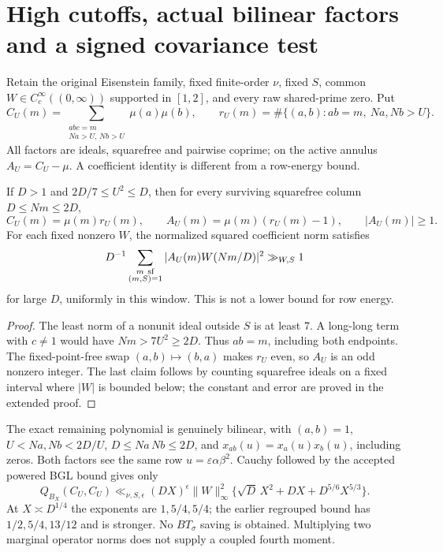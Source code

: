 \section{High cutoffs, actual bilinear factors and a signed covariance test}\label{sb:core}
Retain the original Eisenstein family, fixed finite-order $\nu$, fixed $S$,
common $W\in C_c^\infty((0,\infty))$ supported in $[1,2]$, and every raw
shared-prime zero. Put
\[
 C_U(m)=\sum_{\substack{abc=m\\Na>U,\,Nb>U}}\mu(a)\mu(b),\qquad
 r_U(m)=\#\{(a,b):ab=m,\ Na,Nb>U\}.
\]
All factors are ideals, squarefree and pairwise coprime; on the active
annulus $A_U=C_U-\mu$. A coefficient identity is different from a row-energy bound.

\begin{proposition}\label{sb:window}
If $D>1$ and $2D/7\le U^2\le D$, then for every surviving squarefree
column $D\le Nm\le2D$,
\[
 C_U(m)=\mu(m)r_U(m),\qquad
 A_U(m)=\mu(m)(r_U(m)-1),\qquad |A_U(m)|\ge1.       
\]
For each fixed nonzero $W$, the normalized squared coefficient norm satisfies
\begin{equation}
 D^{-1}\sum_{\substack{m\ {\rm sf}\\(m,S)=1}}
 |A_U(m)W(Nm/D)|^2\gg_{W,S}1                     \label{sb:coefficient-lower}
\end{equation}
for large $D$, uniformly in this window. This is not a lower bound for row energy.
\end{proposition}
\begin{proof}
The least norm of a nonunit ideal outside $S$ is at least $7$. A long-long
term with $c\ne1$ would have $Nm>7U^2\ge2D$. Thus $ab=m$, including both
endpoints. The fixed-point-free swap $(a,b)\mapsto(b,a)$ makes $r_U$ even,
so $A_U$ is an odd nonzero integer. The last claim follows by counting
squarefree ideals on a fixed interval where $|W|$ is bounded below; the
constant and error are proved in the extended proof.
\end{proof}

The exact remaining polynomial is genuinely bilinear, with $(a,b)=1$,
$U<Na,Nb<2D/U$, $D\le Na\,Nb\le2D$, and
$x_{ab}(u)=x_a(u)x_b(u)$, including zeros. Both factors see the same row
$u=\varepsilon\alpha\beta^2$. Cauchy followed by the accepted powered BGL
bound gives only
\begin{equation}
 Q_{B_X}(C_U,C_U)\ll_{\nu,S,\epsilon}
 (DX)^\epsilon\|W\|_\infty^2
 \{\sqrt D\,X^2+DX+D^{5/6}X^{5/3}\}.              \label{sb:factor-bound}
\end{equation}
At $X\asymp D^{1/4}$ the exponents are $1,5/4,5/4$; the earlier regrouped
bound has $1/2,5/4,13/12$ and is stronger. No $BT_\sigma$ saving is obtained.
Multiplying two marginal operator norms does not supply a coupled fourth moment.

